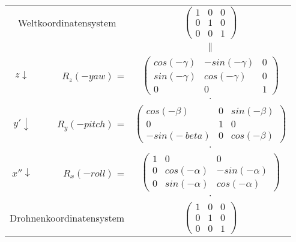 \documentclass[border=0.1cm,varwidth=\maxdimen]{standalone}
\begin{document}
	$ {}^{} $\newline
	\begin{tabular}{crc}
		\multicolumn{2}{c}{Weltkoordinatensystem} & $\begin{pmatrix}
				1 & 0 & 0\\
				0 & 1 & 0\\
				0 & 0 & 1
			\end{pmatrix}$ \\
		\multicolumn{2}{c}{} & $\parallel$ \\
		$z \downarrow$ & $R_{z}(-yaw)$ =& 
		$\begin{pmatrix}
			cos(-\gamma) & -sin(-\gamma) & 0\\
			sin(-\gamma) & cos(-\gamma) & 0\\
			0 & 0 & 1
		\end{pmatrix} $ \\
		\multicolumn{2}{c}{} & $\cdot$ \\
		$y' \downarrow$ & $R_{y}(-pitch)$ =& 
		$\begin{pmatrix}
			cos(-\beta) & 0 & sin(-\beta)\\
			0 & 1 & 0\\
			-sin(-\
			beta) & 0 & cos(-\beta)
		\end{pmatrix} $ \\
		\multicolumn{2}{c}{} & $\cdot $ \\
		$x'' \downarrow$ & $R_{x}(-roll)$ =& 
		$\begin{pmatrix}
			1 & 0 & 0\\
			0 & cos(-\alpha) & -sin(-\alpha)\\
			0 & sin(-\alpha) & cos(-\alpha)
		\end{pmatrix} $ \\
		\multicolumn{2}{c}{} & $\cdot $ \\
		\multicolumn{2}{c}{Drohnenkoordinatensystem} & $\begin{pmatrix}
				1 & 0 & 0\\
				0 & 1 & 0\\
				0 & 0 & 1
			\end{pmatrix}$ \\
	\end{tabular}
\end{document}
